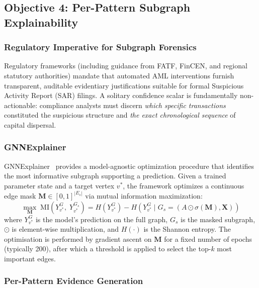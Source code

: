 \subsection{Objective 4: Per-Pattern Subgraph Explainability}
\label{subsec:explainability}

\subsubsection{Regulatory Imperative for Subgraph Forensics}

Regulatory frameworks (including guidance from FATF, FinCEN, and regional statutory authorities) mandate that automated AML interventions furnish transparent, auditable evidentiary justifications suitable for formal Suspicious Activity Report (SAR) filings. A solitary confidence scalar is fundamentally non-actionable: compliance analysts must discern \textit{which specific transactions} constituted the suspicious structure and \textit{the exact chronological sequence} of capital dispersal.

\subsubsection{GNNExplainer}

GNNExplainer~\cite{ying2019gnnexplainer} provides a model-agnostic optimization procedure that identifies the most informative subgraph supporting a prediction. Given a trained parameter state and a target vertex $v^*$, the framework optimizes a continuous edge mask $\mathbf{M} \in [0,1]^{|E_{s}|}$ via mutual information maximization:
\begin{equation}
\max_{\mathbf{M}} \; \text{MI}\!\left( Y_{v^*}^G, \; Y_{v^*}^{G_s} \right) = H\!\left(Y_{v^*}^G\right) - H\!\left(Y_{v^*}^G \mid G_s = (A \odot \sigma(\mathbf{M}), \mathbf{X})\right)
\label{eq:gnnexplainer}
\end{equation}
where $Y_{v^*}^G$ is the model's prediction on the full graph, $G_s$ is the masked subgraph, $\odot$ is element-wise multiplication, and $H(\cdot)$ is the Shannon entropy. The optimisation is performed by gradient ascent on $\mathbf{M}$ for a fixed number of epochs (typically 200), after which a threshold is applied to select the top-$k$ most important edges.

\subsubsection{Per-Pattern Evidence Generation}


